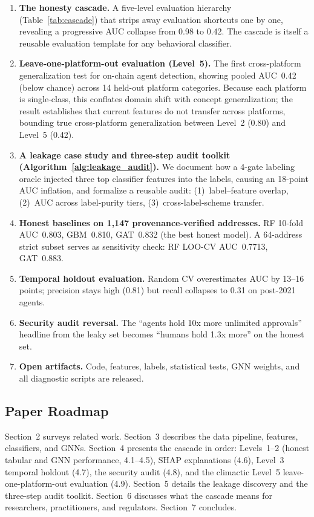 \documentclass[sigconf,nonacm=false]{acmart}
\begin{document}
\begin{enumerate}
    \item \textbf{The honesty cascade.} A five-level evaluation hierarchy (Table~\ref{tab:cascade}) that strips away evaluation shortcuts one by one, revealing a progressive AUC collapse from 0.98 to 0.42. The cascade is itself a reusable evaluation template for any behavioral classifier.
    \item \textbf{Leave-one-platform-out evaluation (Level~5).} The first cross-platform generalization test for on-chain agent detection, showing pooled AUC~0.42 (below chance) across 14 held-out platform categories. Because each platform is single-class, this conflates domain shift with concept generalization; the result establishes that current features do not transfer across platforms, bounding true cross-platform generalization between Level~2 (0.80) and Level~5 (0.42).
    \item \textbf{A leakage case study and three-step audit toolkit (Algorithm~\ref{alg:leakage_audit}).} We document how a 4-gate labeling oracle injected three top classifier features into the labels, causing an 18-point AUC inflation, and formalize a reusable audit: (1)~label--feature overlap, (2)~AUC across label-purity tiers, (3)~cross-label-scheme transfer.
    \item \textbf{Honest baselines on 1{,}147 provenance-verified addresses.} RF 10-fold AUC~0.803, GBM~0.810, GAT~0.832 (the best honest model). A 64-address strict subset serves as sensitivity check: RF LOO-CV AUC~0.7713, GAT~0.883.
    \item \textbf{Temporal holdout evaluation.} Random CV overestimates AUC by 13--16 points; precision stays high (0.81) but recall collapses to 0.31 on post-2021 agents.
    \item \textbf{Security audit reversal.} The ``agents hold 10x more unlimited approvals'' headline from the leaky set becomes ``humans hold 1.3x more'' on the honest set.
    \item \textbf{Open artifacts.} Code, features, labels, statistical tests, GNN weights, and all diagnostic scripts are released.
\end{enumerate}

\subsection{Paper Roadmap}

Section~2 surveys related work. Section~3 describes the data pipeline, features, classifiers, and GNNs. Section~4 presents the cascade in order: Levels~1--2 (honest tabular and GNN performance, 4.1--4.5), SHAP explanations (4.6), Level~3 temporal holdout (4.7), the security audit (4.8), and the climactic Level~5 leave-one-platform-out evaluation (4.9). Section~5 details the leakage discovery and the three-step audit toolkit. Section~6 discusses what the cascade means for researchers, practitioners, and regulators. Section~7 concludes.
\end{document}
